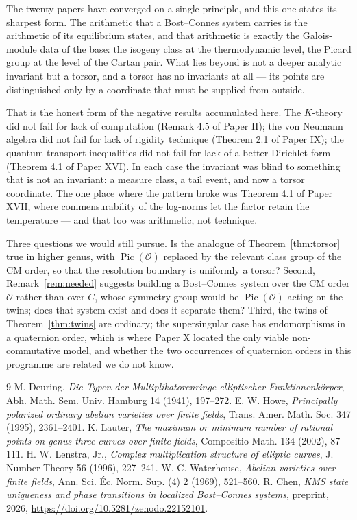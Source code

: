 \documentclass[11pt]{amsart}
\numberwithin{equation}{section}
\theoremstyle{definition}
\theoremstyle{remark}
\newcommand{\cO}{\mathcal{O}}
\newcommand{\Pic}{\operatorname{Pic}}
\begin{document}
The twenty papers have converged on a single principle, and this one states its sharpest
form. The arithmetic that a Bost--Connes system carries is the arithmetic of its equilibrium
states, and that arithmetic is exactly the Galois-module data of the base: the isogeny class
at the thermodynamic level, the Picard group at the level of the Cartan pair. What lies
beyond is not a deeper analytic invariant but a torsor, and a torsor has no invariants at
all --- its points are distinguished only by a coordinate that must be supplied from outside.

That is the honest form of the negative results accumulated here. The $K$-theory did not fail
for lack of computation (Remark 4.5 of Paper II); the von Neumann algebra did not fail for
lack of rigidity technique (Theorem 2.1 of Paper IX); the quantum transport inequalities did not
fail for lack of a better Dirichlet form (Theorem 4.1 of Paper XVI). In each case the invariant
was blind to something that is not an invariant: a measure class, a tail event, and now a
torsor coordinate. The one place where the pattern broke was
Theorem 4.1 of Paper XVII, where commensurability of the log-norms let the factor retain the
temperature --- and that too was arithmetic, not technique.

Three questions we would still pursue. Is the analogue of Theorem~\ref{thm:torsor} true in
higher genus, with $\Pic(\cO)$ replaced by the relevant class group of the CM order, so that
the resolution boundary is uniformly a torsor? Second, Remark~\ref{rem:needed} suggests
building a Bost--Connes system over the CM order $\cO$ rather than over $C$, whose symmetry
group would be $\Pic(\cO)$ acting on the twins; does that system exist and does it separate
them? Third, the twins of Theorem~\ref{thm:twins} are ordinary; the supersingular case has
endomorphisms in a quaternion order, which is where Paper X located the only viable
non-commutative model, and whether the two occurrences of quaternion orders in this programme
are related we do not know.

\begin{thebibliography}{9}
 M. Deuring, \emph{Die Typen der Multiplikatorenringe elliptischer Funktionenk\"orper}, Abh. Math. Sem. Univ. Hamburg 14 (1941), 197--272.
 E. W. Howe, \emph{Principally polarized ordinary abelian varieties over finite fields}, Trans. Amer. Math. Soc. 347 (1995), 2361--2401.
 K. Lauter, \emph{The maximum or minimum number of rational points on genus three curves over finite fields}, Compositio Math. 134 (2002), 87--111.
 H. W. Lenstra, Jr., \emph{Complex multiplication structure of elliptic curves}, J. Number Theory 56 (1996), 227--241.
 W. C. Waterhouse, \emph{Abelian varieties over finite fields}, Ann. Sci. \'Ec. Norm. Sup. (4) 2 (1969), 521--560.
 R. Chen, \emph{KMS state uniqueness and phase transitions in localized Bost--Connes systems}, preprint, 2026, \newline\url{https://doi.org/10.5281/zenodo.22152101}.
\end{thebibliography}
\end{document}
